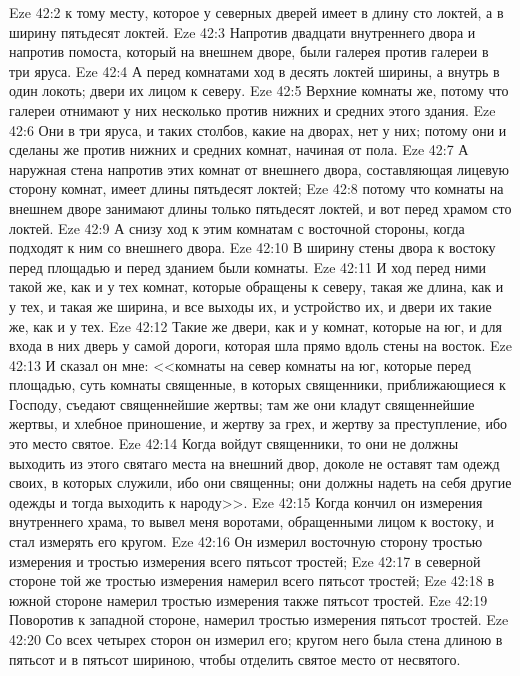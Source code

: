 \vs Eze 42:2 к тому месту, которое у северных дверей имеет в длину сто локтей, а в ширину пятьдесят локтей.
\vs Eze 42:3 Напротив двадцати  внутреннего двора и напротив помоста, который на внешнем дворе, были галерея против галереи в три яруса.
\vs Eze 42:4 А перед комнатами ход в десять локтей ширины, а внутрь в один локоть; двери их лицом к северу.
\vs Eze 42:5 Верхние комнаты же, потому что галереи отнимают у них несколько против нижних и средних  этого здания.
\vs Eze 42:6 Они в три яруса, и таких столбов, какие на дворах, нет у них; потому они и сделаны же против нижних и средних комнат, начиная от пола.
\vs Eze 42:7 А наружная стена напротив этих комнат от внешнего двора, составляющая лицевую сторону комнат, имеет длины пятьдесят локтей;
\vs Eze 42:8 потому что  комнаты на внешнем дворе занимают длины только пятьдесят локтей, и вот перед храмом сто локтей.
\vs Eze 42:9 А снизу ход к этим комнатам с восточной стороны, когда подходят к ним со внешнего двора.
\vs Eze 42:10 В ширину стены двора к востоку перед площадью и перед зданием были комнаты.
\vs Eze 42:11 И ход перед ними такой же, как и у тех комнат, которые обращены к северу, такая же длина, как и у тех, и такая же ширина, и все выходы их, и устройство их, и двери их такие же, как и у тех.
\vs Eze 42:12 Такие же двери, как и у комнат, которые на юг, и для входа в них дверь у самой дороги, которая шла прямо вдоль стены на восток.
\vs Eze 42:13 И сказал он мне: <<комнаты на север  комнаты на юг, которые перед площадью, суть комнаты священные, в которых священники, приближающиеся к Господу, съедают священнейшие жертвы; там же они кладут священнейшие жертвы, и хлебное приношение, и жертву за грех, и жертву за преступление, ибо это место святое.
\vs Eze 42:14 Когда войдут  священники, то они не должны выходить из этого святаго места на внешний двор, доколе не оставят там одежд своих, в которых служили, ибо они священны; они должны надеть на себя другие одежды и тогда выходить к народу>>.
\vs Eze 42:15 Когда кончил он измерения внутреннего храма, то вывел меня воротами, обращенными лицом к востоку, и стал измерять его кругом.
\vs Eze 42:16 Он измерил восточную сторону тростью измерения и  тростью измерения всего пятьсот тростей;
\vs Eze 42:17 в северной стороне той же тростью измерения намерил всего пятьсот тростей;
\vs Eze 42:18 в южной стороне намерил тростью измерения также пятьсот тростей.
\vs Eze 42:19 Поворотив к западной стороне, намерил тростью измерения пятьсот тростей.
\vs Eze 42:20 Со всех четырех сторон он измерил его; кругом него была стена длиною в пятьсот  и в пятьсот  шириною, чтобы отделить святое место от несвятого.
